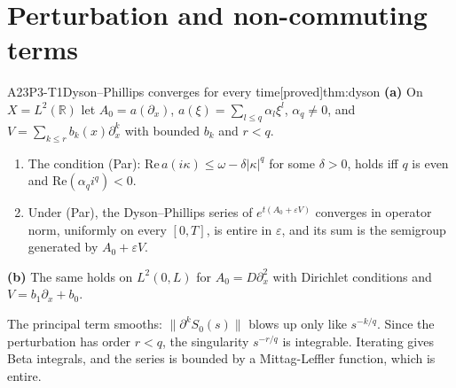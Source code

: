 \documentclass[11pt,a4paper,oneside]{report}
\newcommand{\badge}[2]{\textcolor{#1}{\textsf{\footnotesize[#2]}}}
\newcommand{\proved}{\badge{cC}{proved}}
\newcommand{\R}{\mathbb{R}}\newcommand{\C}{\mathbb{C}}\newcommand{\N}{\mathbb{N}}\newcommand{\Z}{\mathbb{Z}}\newcommand{\Q}{\mathbb{Q}}
\newenvironment{dimcard}[5]{\par\Needspace{12\baselineskip}\begin{dimcardbox}{#1}{#2}{#3}{#4}{#5}}{\end{dimcardbox}}
\begin{document}
\section{Perturbation and non-commuting terms}

\begin{dimcard}{A23}{P3-T1}{Dyson--Phillips converges for every time}{\proved}{thm:dyson}
\textbf{(a)} On $X=L^2(\R)$ let $A_0=a(\partial_x)$, $a(\xi)=\sum_{l\le q}\alpha_l\xi^l$, $\alpha_q\ne0$, and $V=\sum_{k\le r}b_k(x)\partial_x^k$ with bounded $b_k$ and $r<q$.
\begin{enumerate}[label=(a\arabic*)]
\item The condition (Par): $\mathrm{Re}\,a(i\kappa)\le\omega-\delta|\kappa|^q$ for some $\delta>0$, holds iff $q$ is even and $\mathrm{Re}(\alpha_qi^q)<0$.
\item Under (Par), the Dyson--Phillips series of $e^{t(A_0+\varepsilon V)}$ converges in operator norm, uniformly on every $[0,T]$, is entire in $\varepsilon$, and its sum is the semigroup generated by $A_0+\varepsilon V$.
\end{enumerate}
\textbf{(b)} The same holds on $L^2(0,L)$ for $A_0=D\partial_x^2$ with Dirichlet conditions and $V=b_1\partial_x+b_0$.
\end{dimcard}

\begin{proofidea}
The principal term smooths: $\|\partial^kS_0(s)\|$ blows up only like $s^{-k/q}$. Since the perturbation has order $r<q$, the singularity $s^{-r/q}$ is integrable. Iterating gives Beta integrals, and the series is bounded by a Mittag-Leffler function, which is entire.
\end{proofidea}
\end{document}
